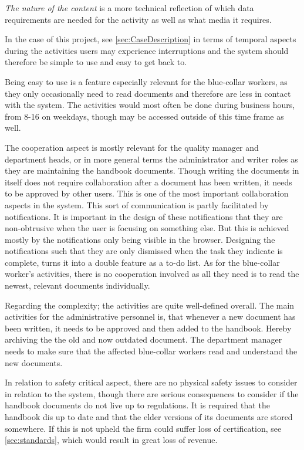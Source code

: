 \textit{The nature of the content} is a more technical reflection of which data requirements are needed for the activity as well as what media it requires.

In the case of this project, see \cref{sec:CaseDescription} in terms of temporal aspects during the activities users may experience interruptions and the system should therefore be simple to use and easy to get back to.

Being easy to use is a feature especially relevant for the blue-collar workers, as they only occasionally need to read documents and therefore are less in contact with the system.
The activities would most often be done during business hours, from 8-16 on weekdays, though may be accessed outside of this time frame as well.

The cooperation aspect is mostly relevant for the  quality manager and department heads, or in more general terms the administrator and writer roles as they are maintaining the handbook documents.
Though writing the documents in itself does not require collaboration after a document has been written, it needs to be approved by other users.
This is one of the most important collaboration aspects in the system.
This sort of communication is partly facilitated by notifications. It is important in the design of these notifications that they are non-obtrusive when the user is focusing on something else. But this is achieved mostly by the notifications only being visible in the browser. Designing the notifications such that they are only dismissed when the task they indicate is complete, turns it into a double feature as a to-do list.
As for the blue-collar worker's activities, there is no cooperation involved as all they need is to read the newest, relevant documents individually.

Regarding the complexity; the activities are quite well-defined overall.
The main activities for the administrative personnel is, that whenever a new document has been written, it needs to be approved and then added to the handbook.
Hereby archiving the the old and now outdated document.
The department manager needs to make sure that the affected blue-collar workers read and understand the new documents.

In relation to safety critical aspect, there are no physical safety issues to consider in relation to the system, though there are serious consequences to consider if the handbook documents do not live up to regulations.
It is required that the handbook dis up to date and that the elder versions of its documents are stored somewhere.
If this is not upheld the firm could suffer loss of certification, see \cref{sec:standards}, which would result in great loss of revenue.

